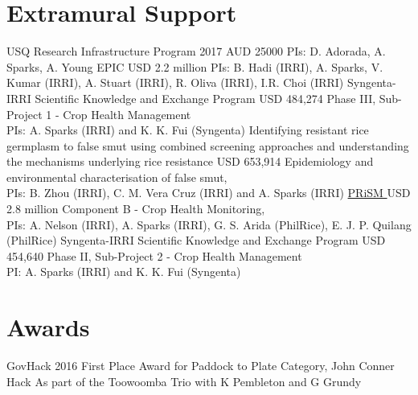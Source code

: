 \section*{Extramural Support}
  \begin{entrylist}

      {USQ Research Infrastructure Program 2017}
      {AUD 25000}
      {PIs: D. Adorada, A. Sparks, A. Young}
      {EPIC }
      {USD 2.2 million}
      {PIs: B. Hadi (IRRI), A. Sparks, V. Kumar (IRRI), A. Stuart (IRRI), R. Oliva (IRRI), I.R. Choi (IRRI)}
	    {Syngenta-IRRI Scientific Knowledge and Exchange Program}
	    {USD 484,274}
	    {Phase III, Sub-Project 1 - Crop Health Management\\PIs: A. Sparks (IRRI) and K. K. Fui (Syngenta)}
      {Identifying resistant rice germplasm to false smut using combined screening approaches and understanding the mechanisms underlying rice resistance}
      {USD 653,914}
      {Epidemiology and environmental characterisation of false smut,\\PIs: B. Zhou (IRRI), C. M. {Vera Cruz} (IRRI) and A. Sparks (IRRI)}
	    {\href{http://philippinericeinfo.ph/}{PRiSM }}
	    {USD 2.8 million}
	    {Component B - Crop Health Monitoring,\\PIs: A. Nelson (IRRI), A. Sparks (IRRI), G. S. Arida (PhilRice), E. J. P. Quilang (PhilRice)}
	    {Syngenta-IRRI Scientific Knowledge and Exchange Program}
	    {USD 454,640}
	    {Phase II, Sub-Project 2 - Crop Health Management\\PI: A. Sparks (IRRI) and K. K. Fui (Syngenta)}
\end{entrylist}

\section*{Awards}
  \begin{entrylist}
    {GovHack 2016 First Place Award for Paddock to Plate Category, John Conner Hack}
    {}
    {As part of the Toowoomba Trio with K Pembleton and G Grundy}
  \end{entrylist}
